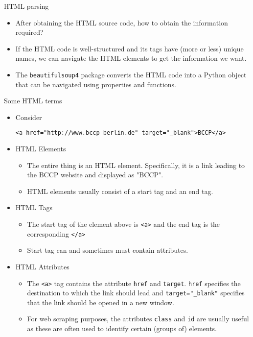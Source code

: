 \begin{frame}{HTML parsing}
\begin{itemize}
	\item After obtaining the HTML source code, how to obtain the information required?
	\item If the HTML code is well-structured and its tags have (more or less) unique names, we can navigate the HTML elements to get the information we want.
	\item The {\tt beautifulsoup4} package converts the HTML code into a Python object that can be navigated using properties and functions.
\end{itemize}
\end{frame}

\begin{frame}[fragile]{Some HTML terms}
\begin{itemize}
	\item Consider 
		\begin{verbatim}
<a href="http://www.bccp-berlin.de" target="_blank">BCCP</a>
\end{verbatim}	 
	\item HTML Elements
	\begin{itemize}
		\item The entire thing is an HTML element. Specifically, it is a link leading to the BCCP website and displayed as "BCCP".
		\item HTML elements usually consist of a start tag and an end tag.
	\end{itemize}
	\item HTML Tags
	\begin{itemize}
		\item The start tag of the element above is {\tt <a>} and the end tag is the corresponding {\tt </a>}
		\item Start tag can and sometimes must contain attributes.
	\end{itemize}
	\item HTML Attributes
	\begin{itemize}
		\item The {\tt <a>} tag contains the attribute {\tt href} and {\tt target}. {\tt href} specifies the destination to which the link should lead and {\tt target="\_blank"} specifies that the link should be opened in a new window.
		\item For web scraping purposes, the attributes {\tt class} and {\tt id} are usually useful as these are often used to identify certain (groups of) elements.
	\end{itemize}
\end{itemize}
\end{frame}

